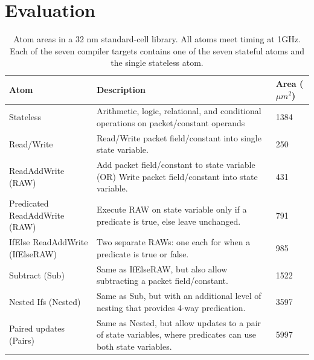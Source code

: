 \section{Evaluation}
\label{s:eval}

\begin{table}[!t]
  \begin{scriptsize}
  \begin{tabular}{|p{}|p{}|p{}|}
    \hline
    Atom & Description & Area ($\mu m^2$)\\
    \hline
    Stateless & Arithmetic, logic, relational, and conditional operations on packet/constant operands & 1384 \\
    \hline
    Read/Write & Read/Write packet field/constant into single state variable. & 250 \\
    \hline
    ReadAddWrite (RAW) & Add packet field/constant to state variable (OR) Write packet field/constant into state variable. & 431 \\
    \hline
    Predicated ReadAddWrite (RAW) & Execute RAW on state variable only if a predicate is true, else leave unchanged. & 791 \\
    \hline
    IfElse ReadAddWrite (IfElseRAW) & Two separate RAWs: one each for when a predicate is true or false. & 985 \\
    \hline
    Subtract (Sub) & Same as IfElseRAW, but also allow subtracting a packet field/constant. & 1522 \\
    \hline
    Nested Ifs (Nested) & Same as Sub, but with an additional level of nesting that provides 4-way predication. & 3597 \\
    \hline
    Paired updates (Pairs) & Same as Nested, but allow updates to a pair of state variables, where predicates can use both state variables. & 5997 \\
    \hline
  \end{tabular}
  \end{scriptsize}
  \caption{Atom areas in a 32 nm standard-cell library.  All atoms meet timing
  at 1GHz. Each of the seven compiler targets contains one of the seven
  stateful atoms and the single stateless atom.}
  \label{tab:templates}
\end{table}

